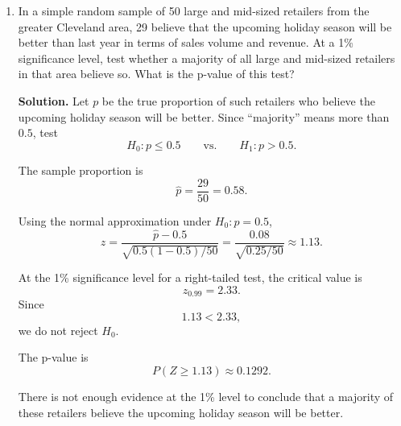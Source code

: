 \documentclass[12pt]{article}
\begin{document}
\begin{enumerate}[label=(\arabic*), leftmargin=*]
\par\medskip
\noindent\textbf{Solution.}
Here $n=25$, $\overline{x}=2.79$, and $s=0.12$. Since $\sigma$ is unknown and the population is assumed Normal, use a $t$ interval:
\[
\overline{x}\pm t_{0.025,24}\frac{s}{\sqrt{n}}.
\]
Using $t_{0.025,24}=2.064$,
\[
2.79\pm 2.064\left(\frac{0.12}{5}\right)
=2.79\pm 0.0495.
\]
Thus the 95\% confidence interval is
\[
\boxed{(2.7405,\ 2.8395)}.
\]

\item In a simple random sample of 50 large and mid-sized retailers from the greater Cleveland area, 29 believe that the upcoming holiday season will be better than last year in terms of sales volume and revenue. At a 1\% significance level, test whether a majority of all large and mid-sized retailers in that area believe so. What is the p-value of this test?

\par\medskip
\noindent\textbf{Solution.}
Let $p$ be the true proportion of such retailers who believe the upcoming holiday season will be better. Since ``majority'' means more than $0.5$, test
\[
H_0:p\le 0.5
\qquad \text{vs.} \qquad
H_1:p>0.5.
\]

The sample proportion is
\[
\hat p=\frac{29}{50}=0.58.
\]

Using the normal approximation under $H_0:p=0.5$,
\[
z=\frac{\hat p-0.5}{\sqrt{0.5(1-0.5)/50}}
=\frac{0.08}{\sqrt{0.25/50}}
\approx 1.13.
\]

At the 1\% significance level for a right-tailed test, the critical value is
\[
z_{0.99}=2.33.
\]
Since
\[
1.13<2.33,
\]
we do not reject $H_0$.

The p-value is
\[
P(Z\ge 1.13)\approx 0.1292.
\]

There is not enough evidence at the 1\% level to conclude that a majority of these retailers believe the upcoming holiday season will be better.

\end{enumerate}
\end{document}
